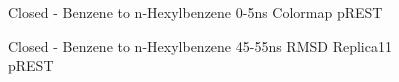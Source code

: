 \documentclass[T4paper.tex]{subfiles}
\begin{document}
\begin{figure}[!ht]
   \caption{Closed - Benzene to n-Hexylbenzene 0-5ns Colormap pREST}
   \label{fig:c_opls3_rest1_1/colormap}
\end{figure}

\begin{figure}[!ht]
   \caption{Closed - Benzene to n-Hexylbenzene 45-55ns RMSD Replica11 pREST}
   \label{fig:c_opls3_rest1_1/45-55ns/RMSD-replica11}
\end{figure}
\end{document}
